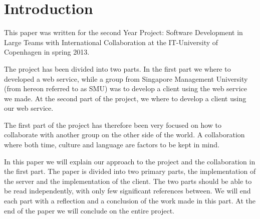 \section{Introduction}
This paper was written for the second Year Project: Software Development in Large Teams with International Collaboration at the IT-University of Copenhagen in spring 2013.

The project has been divided into two parts. In the first part we where to developed a web service, while a group from Singapore Management University (from hereon referred to as SMU) was to develop a client using the web service we made. At the second part of the project, we where to develop a client using our web service.

The first part of the project has therefore been very focused on how to collaborate with another group on the other side of the world. A collaboration where both time, culture and language are factors to be kept in mind.

In this paper we will explain our approach to the project and the collaboration in the first part.
The paper is divided into two primary parts, the implementation of the server and the implementation of the client.
The two parts should be able to be read independently, with only few significant references between. We will end each part with a reflection and a conclusion of the work made in this part.
At the end of the paper we will conclude on the entire project.
\newpage